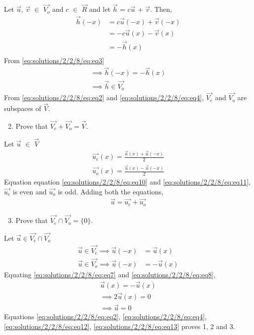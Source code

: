 Let $\vec{u}$, $\vec{v}$ $\in$ $\vec{V_o}$ and $c$ $\in$ $\vec{R}$ and let $\vec{h}$ = $c\vec{u}$ + $\vec{v}$. Then,
\begin{equation} \label{eq:solutions/2/2/8/eq:eq3}
\begin{split}
\vec{h}(-x) &= c \vec{u}(-x) + \vec{v}(-x)\\
 & = -c \vec{u}(x) - \vec{v}(x)\\
& = -\vec{h}(x)\\
\end{split}
\end{equation}
From \eqref{eq:solutions/2/2/8/eq:eq3}
\begin{align}
\implies \vec{h}(-x) = -\vec{h}(x)\\
\implies \vec{h} \in \vec{V_o} \label{eq:solutions/2/2/8/eq:eq4}
\end{align}
From \eqref{eq:solutions/2/2/8/eq:eq2} and \eqref{eq:solutions/2/2/8/eq:eq4}, $\vec{V_e}$ and $\vec{V_o}$ are subspaces of $\vec{V}$.\\
\begin{enumerate}
    \setcounter{enumi}{1}
   \item Prove that $\vec{V_e} + \vec{V_o} = \vec{V}$.
 \end{enumerate}
Let $\vec{u}$ $\in$ $\vec{V}$
\begin{align}
    \vec{u_e}(x) = \frac{\vec{u}(x)+\vec{u}(-x)}{2} \label{eq:solutions/2/2/8/eq:eq10}\\
    \vec{u_o}(x) = \frac{\vec{u}(x)-\vec{u}(-x)}{2} \label{eq:solutions/2/2/8/eq:eq11}
\end{align}
Equation equation \eqref{eq:solutions/2/2/8/eq:eq10} and \eqref{eq:solutions/2/2/8/eq:eq11}, $\vec{u_e}$ is even and $\vec{u_o}$ is odd. Adding both the equations,
\begin{align}
    \vec{u} = \vec{u_e} + \vec{u_o} \label{eq:solutions/2/2/8/eq:eq12}
\end{align}

\begin{enumerate}
    \setcounter{enumi}{2}
   \item Prove that $\vec{V_e} \cap \vec{V_o} = \{0\}$.
 \end{enumerate}
Let $\vec{u} \in \vec{V_e} \cap \vec{V_o}$
\begin{align}
    \vec{u} \in \vec{V_e} \implies \vec{u}(-x) &= \vec{u}(x) \label{eq:solutions/2/2/8/eq:eq7}\\
    \vec{u} \in \vec{V_o} \implies \vec{u}(-x) &= -\vec{u}(x) \label{eq:solutions/2/2/8/eq:eq8}
\end{align}
Equating \eqref{eq:solutions/2/2/8/eq:eq7} and \eqref{eq:solutions/2/2/8/eq:eq8},
\begin{align}
    \vec{u}(x) = -\vec{u}(x)\\
    \implies 2\vec{u}(x)=0\\
    \implies \vec{u}=0 \label{eq:solutions/2/2/8/eq:eq13}
\end{align}
Equations \eqref{eq:solutions/2/2/8/eq:eq2}, \eqref{eq:solutions/2/2/8/eq:eq4}, \eqref{eq:solutions/2/2/8/eq:eq12}, \eqref{eq:solutions/2/2/8/eq:eq13} proves 1, 2 and 3.
